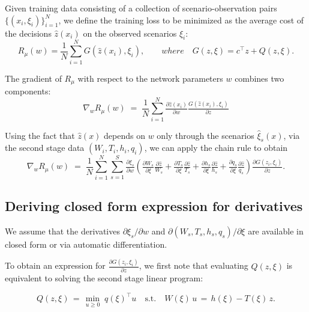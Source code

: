 \documentclass{article}
\begin{document}
Given training data consisting of a collection of scenario-observation pairs $\{(x_i,\xi_i)\}_{i=1}^N$, we define the training loss to be minimized as the 
average cost of the decisions $\hat z(x_i)$ on the observed scenarios $\xi_i$:
\begin{equation}
R_\mu(w) = \frac{1}{N}\sum_{i=1}^N G(\hat z(x_i), \xi_i), 
\qquad  where \quad 
G(z,\xi) = c^\top z + Q(z,\xi).
\end{equation}

The gradient of $R_\mu$ with respect to the network parameters $w$ combines two components:
\begin{equation}
\nabla_w R_\mu(w) \;=\; \frac{1}{N}\sum_{i=1}^N
\tfrac{\partial \hat z(x_i)}{\partial w} \tfrac{G(\hat z(x_i), \xi_i)}{\partial z}
\end{equation}

Using the fact that $\hat z(x)$ depends on $w$ only through the scenarios $\hat \xi_s(x)$, via the second stage data $(W_i, T_i, h_i, q_i)$, we can apply the chain rule to obtain
\begin{equation}
\nabla_w R_\mu(w) \;=\; \frac{1}{N}\sum_{i=1}^N \sum_{s=1}^S \tfrac{\partial \xi_s}{\partial w} \left(
\tfrac{\partial W_s}{\partial \xi} \tfrac{\partial \hat z}{W_s} + 
\tfrac{\partial T_s}{\partial \xi} \tfrac{\partial \hat z}{T_s} +
\tfrac{\partial h_s}{\partial \xi} \tfrac{\partial \hat z}{h_s} +
\tfrac{\partial q_s}{\partial \xi} \tfrac{\partial \hat z}{q_s} \right)
\tfrac{\partial G(z_i, \xi_i)}{\partial z}.
\end{equation}

\subsection{Deriving closed form expression for derivatives}

We assume that the derivatives $\partial \xi_s/\partial w$ and $\partial (W_s,T_s,h_s,q_s)/\partial \xi$ are available in closed form or via automatic differentiation.

To obtain an expression for $\tfrac{\partial G(z_i, \xi_i)}{\partial z}$, we first note that 
evaluating $Q(z, \xi)$ is equivalent to solving the second stage linear program:



\begin{equation}
Q(z,\xi) \,=\, \min_{u \ge 0} \; q(\xi)^\top u \quad \text{s.t.}\quad W(\xi)\,u \,=\, h(\xi) - T(\xi)\,z.
\end{equation}
\end{document}
